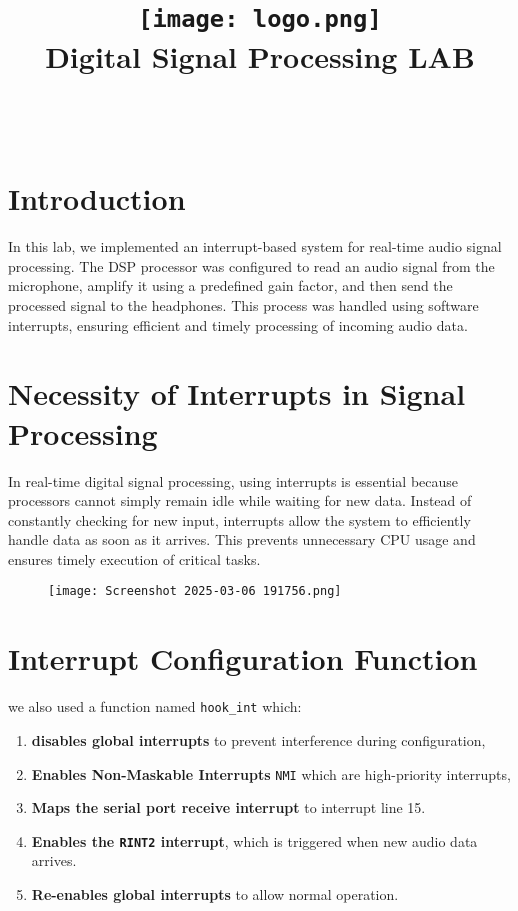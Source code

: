 \documentclass{article}
\title{
    \texttt{[image: logo.png]} \\ %
    Digital Signal Processing LAB\par \exerciseset
}
\author{\FirstAuthor \\ \SecondAuthor}
\date{}
\begin{document}
\maketitle

\section*{Introduction}
In this lab, we implemented an interrupt-based system for real-time audio signal processing. The DSP processor was configured to read an audio signal from the microphone, amplify it using a predefined gain factor, and then send the processed signal to the headphones. This process was handled using software interrupts, ensuring efficient and timely processing of incoming audio data.




\section*{Necessity of Interrupts in Signal Processing}
In real-time digital signal processing, using interrupts is essential because processors cannot simply remain idle while waiting for new data. Instead of constantly checking for new input, interrupts allow the system to efficiently handle data as soon as it arrives. This prevents unnecessary CPU usage and ensures timely execution of critical tasks.

\begin{figure}[h!]
    \centering
    \texttt{[image: Screenshot 2025-03-06 191756.png]} %
    \caption{}
    \label{fig:gr3}
\end{figure}


\section*{Interrupt Configuration Function}
we also used a function named \texttt{hook\_int} which:
\begin{enumerate}
    \item \textbf{disables global interrupts }to prevent interference during configuration,
    \item \textbf{Enables Non-Maskable Interrupts} \texttt{NMI} which are high-priority interrupts,
    \item \textbf{Maps the serial port receive interrupt} to interrupt line 15.
    \item \textbf{Enables the \texttt{RINT2} interrupt}, which is triggered when new audio data arrives.
    \item \textbf{Re-enables global interrupts} to allow normal operation.
\end{enumerate}
\end{document}
